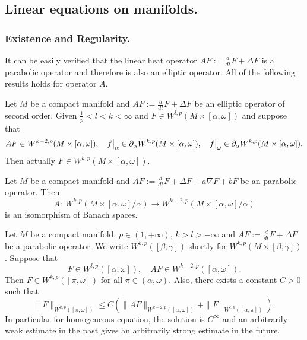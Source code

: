 \subsection{Linear equations on manifolds.}
\label{sec:orgd35bcf3}

\subsubsection{Existence and Regularity.}
\label{sec:org644a45f}

It can be easily verified that the linear heat operator \(AF:= \frac{d}{dt}F + \Delta F\)
is a parabolic operator and therefore is also an elliptic operator. All of the following results
holds for operator \(A\).

\begin{theorem}
\label{thm:elliptic-d}
Let \(M\) be a compact manifold and \(AF:= \frac{d}{dt}F + \Delta F\) be an elliptic
operator of second order. Given \(\frac{1}{p} < l < k <\infty\) and \(F\in
W^{l,p}(M\times[\alpha,\omega])\) and suppose that 
\[
 AF\in W^{k-2,p}(M\times[\alpha,\omega]),\quad \restr{f}{\alpha}\in \partial_\alpha
W^{k,p}(M\times[\alpha,\omega]), \quad  \restr{f}{\omega}\in \partial_\alpha W^{k,p}(M\times[\alpha,\omega]).
\]
Then actually \(F\in W^{k,p}(M\times[\alpha,\omega])\).
\end{theorem}


\begin{theorem}
\label{thm:para-existence-d}
Let \(M\) be a compact manifold and \(AF:= \frac{d}{dt}F + \Delta F + a\nabla F + bF\) be an parabolic
operator. Then 
\[
 A:\ W^{k,p}(M\times[\alpha,\omega]/\alpha) \longrightarrow W^{k-2,p}(M\times[\alpha,\omega]/\alpha)
\]
is an isomorphism of Banach spaces.
\end{theorem}


\begin{theorem}
\label{thm:para-eq-d }
Let \(M\) be a compact manifold, \(p\in (1,+\infty)\), \(k > l > -\infty\) and \(AF:= \frac{d}{dt}F + \Delta F\) be a parabolic operator. We write \(W^{k,p}([\beta,\gamma])\) shortly for \(W^{k,p}(M\times[\beta,\gamma])\). Suppose that
\[
 F\in W^{l,p}([\alpha,\omega]),\quad AF\in W^{k-2,p}([\alpha,\omega]).
\]
Then \(F\in W^{k,p}([\pi,\omega])\) for all \(\pi\in (\alpha,\omega)\). Also, there
exists a constant \(C>0\) such that 
\[
 \|F\|_{W^{k,p}([\pi,\omega])} \leq C \left( \|AF\|_{W^{k-2,p}([\alpha,\omega])} + \| F \|_{W^{l,p}([\alpha,\pi])}  \right).
\]
In particular for homogeneous equation, the solution is \(C^\infty\) and an arbitrarily weak estimate in the past gives an arbitrarily strong estimate in the future. 
\end{theorem}

